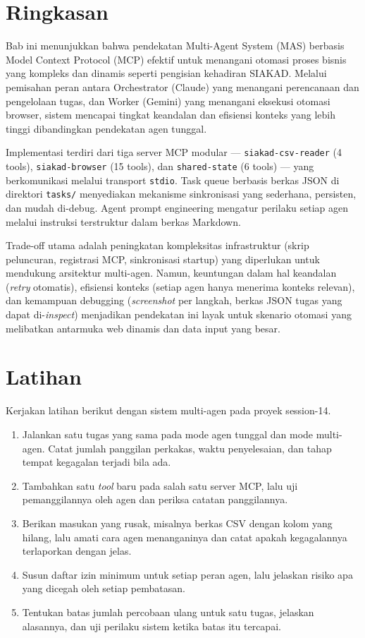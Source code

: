 \section{Ringkasan}

Bab ini menunjukkan bahwa pendekatan Multi-Agent System (MAS) berbasis Model Context Protocol (MCP) efektif untuk menangani otomasi proses bisnis yang kompleks dan dinamis seperti pengisian kehadiran SIAKAD. Melalui pemisahan peran antara Orchestrator (Claude) yang menangani perencanaan dan pengelolaan tugas, dan Worker (Gemini) yang menangani eksekusi otomasi browser, sistem mencapai tingkat keandalan dan efisiensi konteks yang lebih tinggi dibandingkan pendekatan agen tunggal.

Implementasi terdiri dari tiga server MCP modular --- \texttt{siakad-csv-reader} (4 tools), \texttt{siakad-browser} (15 tools), dan \texttt{shared-state} (6 tools) --- yang berkomunikasi melalui transport \texttt{stdio}. Task queue berbasis berkas JSON di direktori \texttt{tasks/} menyediakan mekanisme sinkronisasi yang sederhana, persisten, dan mudah di-debug. Agent prompt engineering mengatur perilaku setiap agen melalui instruksi terstruktur dalam berkas Markdown.

Trade-off utama adalah peningkatan kompleksitas infrastruktur (skrip peluncuran, registrasi MCP, sinkronisasi startup) yang diperlukan untuk mendukung arsitektur multi-agen. Namun, keuntungan dalam hal keandalan (\textit{retry} otomatis), efisiensi konteks (setiap agen hanya menerima konteks relevan), dan kemampuan debugging (\textit{screenshot} per langkah, berkas JSON tugas yang dapat di-\textit{inspect}) menjadikan pendekatan ini layak untuk skenario otomasi yang melibatkan antarmuka web dinamis dan data input yang besar.

\section{Latihan}

Kerjakan latihan berikut dengan sistem multi-agen pada proyek session-14.

\begin{enumerate}
  \item Jalankan satu tugas yang sama pada mode agen tunggal dan mode multi-agen. Catat jumlah panggilan perkakas, waktu penyelesaian, dan tahap tempat kegagalan terjadi bila ada.
  \item Tambahkan satu \textit{tool} baru pada salah satu server MCP, lalu uji pemanggilannya oleh agen dan periksa catatan panggilannya.
  \item Berikan masukan yang rusak, misalnya berkas CSV dengan kolom yang hilang, lalu amati cara agen menanganinya dan catat apakah kegagalannya terlaporkan dengan jelas.
  \item Susun daftar izin minimum untuk setiap peran agen, lalu jelaskan risiko apa yang dicegah oleh setiap pembatasan.
  \item Tentukan batas jumlah percobaan ulang untuk satu tugas, jelaskan alasannya, dan uji perilaku sistem ketika batas itu tercapai.
\end{enumerate}

